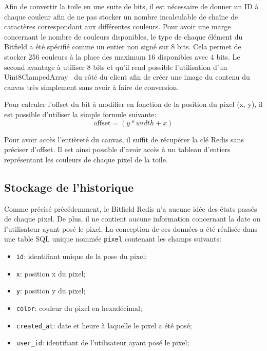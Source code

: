 Afin de convertir la toile en une suite de bits, il est nécessaire de donner un ID à chaque couleur afin de ne pas stocker un nombre incalculable de chaîne de caractères correspondant aux différentes couleurs. Pour avoir une marge concernant le nombre de couleurs disponibles, le type de chaque élément du Bitfield a été spécifié comme un entier non signé sur 8 bits. Cela permet de stocker 256 couleurs à la place des maximum 16 disponibles avec 4 bits. Le second avantage à utiliser 8 bits et qu'il rend possible l'utilisation d'un Uint8ClampedArray~\cite{uint8clampedarray} du côté du client afin de créer une image du contenu du canvas très simplement sans avoir à faire de conversion.

Pour calculer l'offset du bit à modifier en fonction de la position du pixel (x, y), il est possible d'utiliser la simple formule suivante:
\begin{equation}
  \mathrm{offset} = (y * width + x)
\end{equation}

Pour avoir accès l'entièreté du canvas, il suffit de récupérer la clé Redis sans préciser d'offset. Il est ainsi possible d'avoir accès à un tableau d'entiers représentant les couleurs de chaque pixel de la toile.

\subsection{Stockage de l'historique}

Comme précisé précédemment, le Bitfield Redis n'a aucune idée des états passés de chaque pixel. De plus, il ne contient aucune information concernant la date ou l'utilisateur ayant posé le pixel. La conception de ces données a été réalisée dans une table SQL unique nommée \texttt{pixel} contenant les champs suivants:

\begin{itemize}
  \item \texttt{id}: identifiant unique de la pose du pixel;
  \item \texttt{x}: position x du pixel;
  \item \texttt{y}: position y du pixel;
  \item \texttt{color}: couleur du pixel en hexadécimal;
  \item \texttt{created\_at}: date et heure à laquelle le pixel a été posé;
  \item \texttt{user\_id}: identifiant de l'utilisateur ayant posé le pixel;
\end{itemize}

